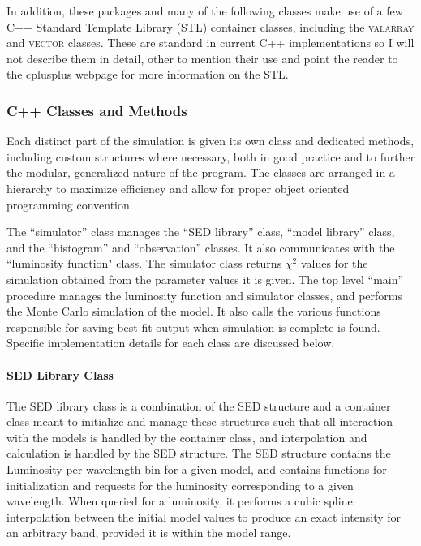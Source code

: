 \documentclass[twocolumn,letterpaper,10pt]{article}
\begin{document}
In addition, these packages and many of the following classes make use of a few C++ Standard Template Library (STL) container classes, including the \textsc{valarray} and \textsc{vector} classes. These are standard in current C++ implementations so I will not describe them in detail, other to mention their use and point the reader to \href{http://www.cplusplus.com/reference/stl/}{the cplusplus webpage} for more information on the STL.

\subsubsection{C++ Classes and Methods}
Each distinct part of the simulation is given its own class and dedicated methods, including custom structures where necessary, both in good practice and to further the modular, generalized nature of the program. The classes are arranged in a hierarchy to maximize efficiency and allow for proper object oriented programming convention.

The ``simulator'' class manages the ``SED library'' class, ``model library'' class, and the ``histogram'' and ``observation'' classes. It also communicates with the ``luminosity function" class. The simulator class returns $\chi^2$ values for the simulation obtained from the parameter values it is given. The top level ``main'' procedure manages the luminosity function and simulator classes, and performs the Monte Carlo simulation of the model. It also calls the various functions responsible for saving best fit output when simulation is complete is found. Specific implementation details for each class are discussed below.

\paragraph{SED Library Class}\label{class:models}
The SED library class is a combination of the SED structure and a container class meant to initialize and manage these structures such that all interaction with the models is handled by the container class, and interpolation and calculation is handled by the SED structure. The SED structure contains the Luminosity per wavelength bin for a given model, and contains functions for initialization and requests for the luminosity corresponding to a given wavelength. When queried for a luminosity, it performs a cubic spline interpolation between the initial model values to produce an exact intensity for an arbitrary band, provided it is within the model range.
\end{document}
